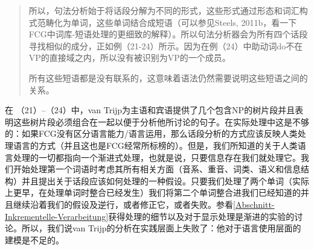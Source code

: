 \begin{quote}
所以，句法分析始于将话段分解为不同的形式，这些形式通过形态和词汇构式范畴化为单词，这些单词结合成短语（可以参见Steels, 2011b，看一下FCG中词库-短语处理的更细致的解释）。所以句法分析器会为所有四个话段寻找相似的成分，正如例（21-24）所示。因为在例（24）中助动词do不在VP的直接域之内，所以没有被识别为VP的一个成员。

所有这些短语都是没有联系的，这意味着语法仍然需要说明这些短语之间的关系。\citep[]{vanTrijp2014a}

\end{quote}
在 （21）--（24）中，van Trijp为主语和宾语提供了几个包含NP的树片段并且表明这些树片段必须组合在一起以便于分析他所讨论的句子。在实际处理中这是不够的：如果FCG没有区分语言能力/语言运用，那么话段分析的方式应该反映人类处理语言的方式（并且这也是FCG经常所标榜的）。但是，我们所知道的关于人类语言处理的一切都指向一个渐进式处理，也就是说，只要信息存在我们就处理它。我们开始处理第一个词语时考虑其所有相关方面（音系、重音、词类、语义和信息结构）并且提出关于话段应该如何处理的一种假设。只要我们处理了两个单词（实际上更早，在处理单词时整合已经发生）我们将第二个单词整合进我们已经知道的并且继续沿着我们的假设及逆行，或者修正它，或者失败。参看\ref{Abschnitt-Inkrementelle-Verarbeitung}获得处理的细节以及对于显示处理是渐进的实验的讨论。所以，我们说van Trijp的分析在实践层面上失败了：他对于语言使用层面的建模是不足的。
